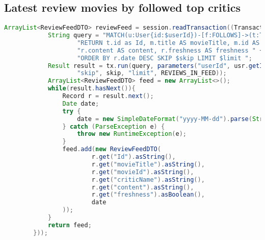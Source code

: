 \subsection{Latest review movies by followed top critics}
\begin{lstlisting}[language = Java, caption = Latest reviews]
ArrayList<ReviewFeedDTO> reviewFeed = session.readTransaction((TransactionWork<ArrayList<ReviewFeedDTO>>)(tx -> {
            String query = "MATCH(u:User{id:$userId})-[f:FOLLOWS]->(t:TopCritic)-[r:REVIEWED]->(m:Movie) "+
                    "RETURN t.id as Id, m.title AS movieTitle, m.id AS movieId, t.name AS criticName, r.date AS reviewDate, "+
                    "r.content AS content, r.freshness AS freshness " +
                    "ORDER BY r.date DESC SKIP $skip LIMIT $limit ";
            Result result = tx.run(query, parameters("userId", usr.getId().toString(),
                    "skip", skip, "limit", REVIEWS_IN_FEED));
            ArrayList<ReviewFeedDTO> feed = new ArrayList<>();
            while(result.hasNext()){
                Record r = result.next();
                Date date;
                try {
                    date = new SimpleDateFormat("yyyy-MM-dd").parse(String.valueOf(r.get("reviewDate").asLocalDate()));
                } catch (ParseException e) {
                    throw new RuntimeException(e);
                }
                feed.add(new ReviewFeedDTO(
                        r.get("Id").asString(),
                        r.get("movieTitle").asString(),
                        r.get("movieId").asString(),
                        r.get("criticName").asString(),
                        r.get("content").asString(),
                        r.get("freshness").asBoolean(),
                        date
                ));
            }
            return feed;
        }));
\end{lstlisting}

